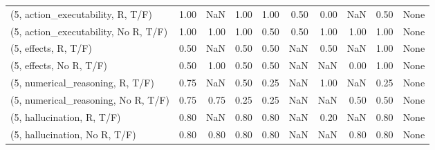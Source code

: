 \begin{table*}[h!]
\begin{adjustbox}{width=2\columnwidth,center}
\begin{tabular}{lrrr|rrr|rrr}
(5, action\_executability, R, T/F)    &                      1.00 &                   NaN &                      1.00 &                          1.00 &                      0.50 &                          0.00 &                                    NaN &                               0.50 &                                  None \\
(5, action\_executability, No R, T/F) &                      1.00 &                  1.00 &                      1.00 &                          0.50 &                      0.50 &                          1.00 &                                   1.00 &                               1.00 &                                  None \\
(5, effects, R, T/F)                 &                      0.50 &                   NaN &                      0.50 &                          0.50 &                       NaN &                          0.50 &                                    NaN &                               1.00 &                                  None \\
(5, effects, No R, T/F)              &                      0.50 &                  1.00 &                      0.50 &                          0.50 &                       NaN &                           NaN &                                   0.00 &                               1.00 &                                  None \\
(5, numerical\_reasoning, R, T/F)     &                      0.75 &                   NaN &                      0.50 &                          0.25 &                       NaN &                          1.00 &                                    NaN &                               0.25 &                                  None \\
(5, numerical\_reasoning, No R, T/F)  &                      0.75 &                  0.75 &                      0.25 &                          0.25 &                       NaN &                           NaN &                                   0.50 &                               0.50 &                                  None \\
(5, hallucination, R, T/F)           &                      0.80 &                   NaN &                      0.80 &                          0.80 &                       NaN &                          0.20 &                                    NaN &                               0.80 &                                  None \\
(5, hallucination, No R, T/F)        &                      0.80 &                  0.80 &                      0.80 &                          0.80 &                       NaN &                           NaN &                                   0.80 &                               0.80 &                                  None \\

\end{tabular}
\end{adjustbox}
\end{table*}
